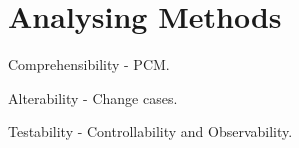 \section{Analysing Methods}

Comprehensibility - PCM.

Alterability - Change cases.

Testability - Controllability and Observability.